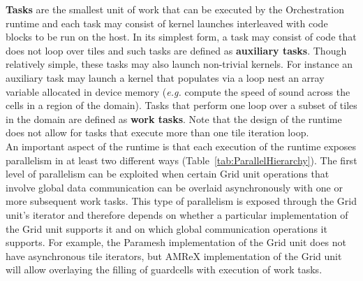 \documentclass{article}
\begin{document}
\textbf{Tasks} are the smallest unit of work that can be executed by the
Orchestration runtime and each task may consist of kernel launches interleaved
with code blocks to be run on the host.  In its simplest form, a task may
consist of code that does not loop over tiles and such tasks are defined as
\textbf{auxiliary tasks}.  Though relatively simple, these tasks may also launch
non-trivial kernels.  For instance an auxiliary task may launch a kernel that
populates via a loop nest an array variable allocated in device memory
(\textit{e.g.} compute the speed of sound across the cells in a region of the
domain).  Tasks that perform one loop over a subset of tiles in the domain are
defined as \textbf{work tasks}.  Note that the design of the runtime does not
allow for tasks that execute more than one tile iteration loop.\\

An important aspect of the runtime is that each execution of the runtime exposes
parallelism in at least two different ways (Table~\ref{tab:ParallelHierarchy}).
The first level of parallelism can be exploited when certain Grid unit
operations that involve global data communication can be overlaid asynchronously
with one or more subsequent work tasks.  This type of parallelism is exposed
through the Grid unit's iterator and therefore depends on whether a particular
implementation of the Grid unit supports it and on which global communication
operations it supports.  For example, the Paramesh implementation of the Grid
unit does not have asynchronous tile iterators, but AMReX implementation of the
Grid unit will allow overlaying the filling of guardcells with execution of work
tasks.\\
\end{document}
